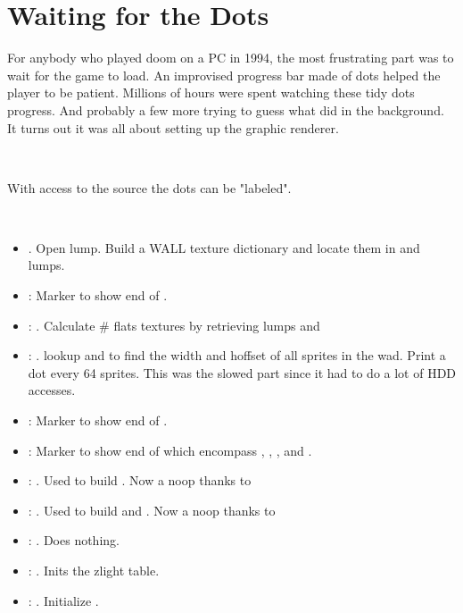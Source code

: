\section{Waiting for the Dots}
\label{dots_explained}
For anybody who played doom on a PC in 1994, the most frustrating part was to wait for the game to load. An improvised progress bar made of dots helped the player to be patient. Millions of hours were spent watching these tidy dots progress. And probably a few more trying to guess what  did in the background. It turns out it was all about setting up the graphic renderer.\\
\par
{}\\
\par
With access to the source the dots can be "labeled".\\
\par
{}\\
\par
\begin{itemize}
\item {} . Open  lump. Build a WALL texture dictionary and locate them in  and  lumps.
\item {}: Marker to show end of .
\item {}: . Calculate \# flats textures by retrieving lumps  and 
\item {}: . lookup  and  to find the width and hoffset of all sprites in the wad. Print a dot every 64 sprites. This was the slowed part since it had to do a lot of HDD accesses.
\item {}: Marker to show end of . 
\item {}: Marker to show end of  which encompass  , , , and .
\item {}: . Used to build . Now a noop thanks to 
\item {}: . Used to build  and . Now a noop thanks to 
\item {}: . Does nothing. 
\item {}: . Inits the zlight table.
\item {}: . Initialize .
\end{itemize}

